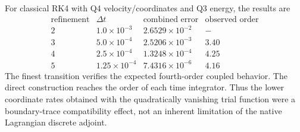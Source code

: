\documentclass[11pt]{article}
\begin{document}
For classical RK4 with Q4 velocity/coordinates and Q3 energy, the results
are
\[
\begin{array}{c|c|c|c}
 \text{refinement} & \Delta t & \text{combined error} &
 \text{observed order}\\ \hline
 2 & 1.0\times10^{-3}  & 2.6529\times10^{-2} & -\\
 3 & 5.0\times10^{-4}  & 2.5206\times10^{-3} & 3.40\\
 4 & 2.5\times10^{-4}  & 1.3248\times10^{-4} & 4.25\\
 5 & 1.25\times10^{-4} & 7.4316\times10^{-6} & 4.16
\end{array}
\]
The finest transition verifies the expected fourth-order coupled behavior.
The direct construction reaches the order of each time integrator.  Thus the
lower coordinate rates obtained with the quadratically vanishing trial
function were a boundary-trace compatibility effect, not an inherent
limitation of the native Lagrangian discrete adjoint.
\end{document}

